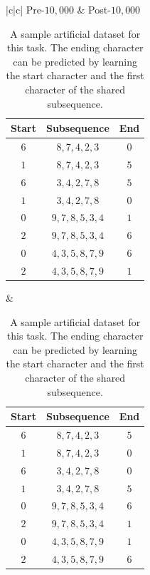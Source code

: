 \documentclass{article}
\begin{document}
\begin{table}[!h]
    \centering
    \begin{tabular}{|c|c|} \hline
        Pre-$10,000$ & Post-$10,000$  \\ \hline
        \begin{tabular}{|c|c|c|}
            Start & Subsequence & End \\ \hline
            $6$ & $8, 7, 4, 2, 3$ & $0$ \\ \hline
            $1$ & $8, 7, 4, 2, 3$ & $5$ \\ \hline
            $6$ & $3, 4, 2, 7, 8$ & $5$ \\ \hline
            $1$ & $3, 4, 2, 7, 8$ & $0$ \\ \hline
            $0$ & $9, 7, 8, 5, 3, 4$ & $1$ \\ \hline
            $2$ & $9, 7, 8, 5, 3, 4$ & $6$ \\ \hline
            $0$ & $4, 3, 5, 8, 7, 9$ & $6$ \\ \hline
            $2$ & $4, 3, 5, 8, 7, 9$ & $1$ \\ \hline
        \end{tabular} &  \begin{tabular}{|c|c|c|}
            Start & Subsequence & End \\ \hline
            $6$ & $8, 7, 4, 2, 3$ & $5$ \\ \hline
            $1$ & $8, 7, 4, 2, 3$ & $0$ \\ \hline
            $6$ & $3, 4, 2, 7, 8$ & $0$ \\ \hline
            $1$ & $3, 4, 2, 7, 8$ & $5$ \\ \hline
            $0$ & $9, 7, 8, 5, 3, 4$ & $6$ \\ \hline
            $2$ & $9, 7, 8, 5, 3, 4$ & $1$ \\ \hline
            $0$ & $4, 3, 5, 8, 7, 9$ & $1$ \\ \hline
            $2$ & $4, 3, 5, 8, 7, 9$ & $6$ \\ \hline
        \end{tabular}\\ \hline
    \end{tabular}
    \caption{A sample artificial dataset for this task. The ending character can be predicted by learning the start character and the first character of the shared subsequence.}
    \label{tab:dataset}
\end{table}
\end{document}
